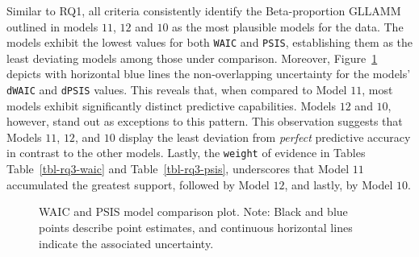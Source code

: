 \documentclass[
sn-apacite
]{sn-jnl}
\begin{document}
Similar to RQ1, all criteria consistently identify the Beta-proportion
GLLAMM outlined in models \(11\), \(12\) and \(10\) as the most
plausible models for the data. The models exhibit the lowest values for
both \texttt{WAIC} and \texttt{PSIS}, establishing them as the least
deviating models among those under comparison. Moreover,
Figure~\ref{fig-rq3-waic-psis} depicts with horizontal blue lines the
non-overlapping uncertainty for the models' \texttt{dWAIC} and
\texttt{dPSIS} values. This reveals that, when compared to Model \(11\),
most models exhibit significantly distinct predictive capabilities.
Models \(12\) and \(10\), however, stand out as exceptions to this
pattern. This observation suggests that Models \(11\), \(12\), and
\(10\) display the least deviation from \emph{perfect} predictive
accuracy in contrast to the other models. Lastly, the \texttt{weight} of
evidence in Tables Table~\ref{tbl-rq3-waic} and
Table~\ref{tbl-rq3-psis}, underscores that Model \(11\) accumulated the
greatest support, followed by Model \(12\), and lastly, by Model \(10\).

\label{cell-fig-rq3-waic-psis}
\begin{figure}[H]


\caption{\label{fig-rq3-waic-psis}WAIC and PSIS model comparison plot.
Note: Black and blue points describe point estimates, and continuous
horizontal lines indicate the associated uncertainty.}

\end{figure}%
\end{document}

